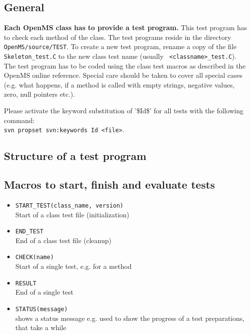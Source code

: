 \documentclass[a4]{article}
\begin{document}
\subsection{General}

{\bf Each OpenMS class has to provide a test program.} This test program has to check
each method of the class. The test programs reside in the directory
{\tt OpenMS/source/TEST}. To create a new test program, rename a copy of the file
{\tt Skeleton\_test.C} to the new class test name (usually {\tt
<classname>\_test.C}). The test program has to be coded using the class test
macros as described in the OpenMS online reference. Special care should be taken
to cover all special cases (e.g. what happens, if a method is called with
empty strings, negative values, zero, null pointers etc.).

Please activate the keyword substitution of '\$Id\$' for all tests with the following command:\\
{\tt svn propset svn:keywords Id <file>}.


\subsection{Structure of a test program}

\subsection{Macros to start, finish and evaluate tests}
\begin{itemize}
        \item {\tt START\_TEST(class\_name, version)} \\ Start of a class test file (initialization)
        \item {\tt END\_TEST} \\ End of a class test file (cleanup)
        \item {\tt CHECK(name)} \\ Start of a single test, e.g. for a method
        \item {\tt RESULT} \\ End of a single test
        \item {\tt STATUS(message)} \\ shows a status message e.g. used to show the progress of a test preparations, that take a while
\end{itemize}
\end{document}
